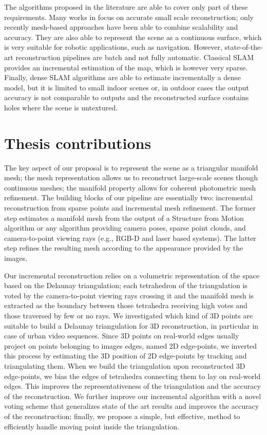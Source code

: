 The algorithms proposed in the literature are able to cover only part of these requirements.
Many works in \mvs focus on accurate small scale reconstruction; only recently mesh-based approaches have been able to combine scalability and accuracy. They are also able to represent the scene as  a continuous surface, which is very suitable for robotic applications, such as navigation.
However, state-of-the-art \mvs reconstruction pipelines are batch and not fully automatic. 
Classical SLAM provides an incremental estimation of the map, which is however very sparse.
Finally, dense SLAM algorithms are able to estimate incrementally a dense model, but it is limited to small indoor scenes or, in outdoor cases the output accuracy is not comparable to \mvs outputs and the reconstructed surface contains holes where the scene is untextured.

\section{Thesis contributions}
The key aspect of our proposal is to represent the scene as a triangular manifold mesh; the mesh representation allows us to reconstruct large-scale scenes though continuous meshes; the manifold property allows for coherent photometric mesh refinement. The building blocks of our pipeline are essentially two: incremental reconstruction from sparse points and incremental mesh refinement. The former step estimates a manifold mesh from the output of a Structure from Motion algorithm or any algorithm providing camera poses, sparse point clouds, and camera-to-point viewing rays (e.g., RGB-D and laser based systems). The latter step refines the resulting mesh according to the appearance provided by the images.

Our incremental reconstruction relies on a volumetric representation of the space based on the Delaunay triangulation; each tetrahedron of the triangulation is voted by the camera-to-point viewing rays crossing it and the manifold mesh is extracted as the boundary between those tetrahedra receiving high votes and those traversed by few or no rays. We investigated which kind of 3D points are suitable to build a Delaunay triangulation for 3D reconstruction, in particular in case of urban video sequences. Since 3D points on real-world edges usually project on points belonging to images edges, named  2D edge-points, we inverted this process by estimating the 3D position of 2D edge-points by tracking and triangulating them. When we build the triangulation upon reconstructed 3D edge-points, we bias the edges of tetrahedra connecting them to lay on real-world edges. This improves the representativeness of the triangulation and the accuracy of the reconstruction. We further improve our incremental algorithm with a novel voting scheme that generalizes state of the art results and improves the accuracy of the reconstruction; finally, we propose a simple, but effective, method to efficiently handle moving point inside the triangulation.

